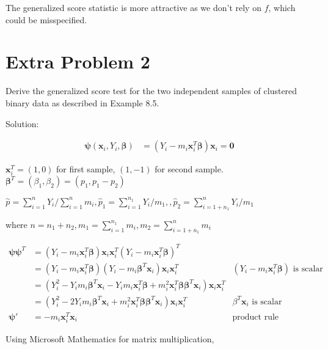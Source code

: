 \documentclass[
  letterpaper,
  DIV=11,
  numbers=noendperiod]{scrreprt}
\begin{document}
The generalized score statistic is more attractive as we don't rely on
\(f\), which could be misspecified.

\newpage

\hypertarget{extra-problem-2}{%
\section{Extra Problem 2}\label{extra-problem-2}}

Derive the generalized score test for the two independent samples of
clustered binary data as described in Example 8.5.

Solution:

\[\begin{aligned}
\boldsymbol \psi(\mathbf x_i,Y_i, \boldsymbol \beta) &= (Y_i - m_i \mathbf x_i^T \boldsymbol \beta) \mathbf x_i = \mathbf 0
\end{aligned}\]

\(\mathbf x_i^T = (1,0)\) for first sample, \((1,-1)\) for second
sample. \(\boldsymbol \beta^T = (\beta_1, \beta_2)=(p_1,p_1-p_2)\)

\(\overset \sim p = \sum_{i=1}^n Y_i/\sum_{i=1}^n m_i, \hat p_1 = \sum_{i=1}^{n_1} Y_i/m_1, , \hat p_2 = \sum_{i=1+n_1}^{n} Y_i/m_1\)

where
\(n = n_1+n_2, m_1 = \sum_{i=1}^{n_1} m_i, m_2 = \sum_{i=1+n_1}^{n} m_i\)

\[\begin{aligned}
\boldsymbol {\psi \psi}^T  &=(Y_i - m_i \mathbf x_i^T \boldsymbol \beta) \mathbf x_i \mathbf x_i^T(Y_i - m_i \mathbf x_i^T \boldsymbol \beta)^T \\
&=(Y_i - m_i \mathbf x_i^T \boldsymbol \beta) (Y_i - m_i \boldsymbol \beta^T\mathbf x_i)\mathbf x_i \mathbf x_i^T & (Y_i - m_i \mathbf x_i^T \boldsymbol \beta) \text{ is scalar}\\
&=(Y_i^2 -Y_i m_i  \boldsymbol \beta^T\mathbf x_i- Y_im_i \mathbf x_i^T \boldsymbol \beta + m_i^2 \mathbf x_i^T \boldsymbol \beta \boldsymbol \beta^T\mathbf x_i)\mathbf x_i \mathbf x_i^T \\
&=(Y_i^2 -2Y_i m_i  \boldsymbol \beta^T\mathbf x_i + m_i^2 \mathbf x_i^T \boldsymbol \beta \boldsymbol \beta^T\mathbf x_i)\mathbf x_i \mathbf x_i^T & \beta^T\mathbf x_i \text{ is scalar} \\
\boldsymbol \psi'  &= - m_i \mathbf x_i^T \mathbf x_i & \text{product rule}
\end{aligned}\]

Using Microsoft Mathematics for matrix multiplication,
\end{document}

